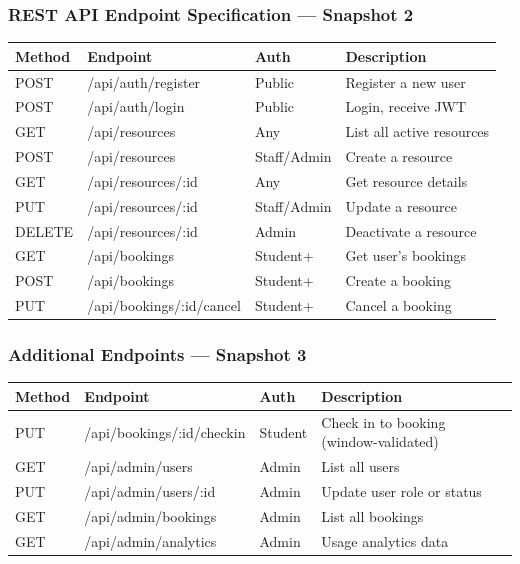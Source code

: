 \documentclass[12pt]{article}
\begin{document}
\subsubsection{REST API Endpoint Specification --- Snapshot 2}

\begin{longtable}{|p{1.4cm}|p{4.5cm}|p{2cm}|p{5cm}|}
\hline
\textbf{Method} & \textbf{Endpoint} & \textbf{Auth} & \textbf{Description} \\
\hline
POST & /api/auth/register & Public & Register a new user \\
\hline
POST & /api/auth/login    & Public & Login, receive JWT \\
\hline
GET  & /api/resources     & Any    & List all active resources \\
\hline
POST & /api/resources     & Staff/Admin & Create a resource \\
\hline
GET  & /api/resources/:id & Any    & Get resource details \\
\hline
PUT  & /api/resources/:id & Staff/Admin & Update a resource \\
\hline
DELETE & /api/resources/:id & Admin  & Deactivate a resource \\
\hline
GET  & /api/bookings      & Student+ & Get user's bookings \\
\hline
POST & /api/bookings      & Student+ & Create a booking \\
\hline
PUT  & /api/bookings/:id/cancel  & Student+ & Cancel a booking \\
\hline
\end{longtable}

\subsubsection{Additional Endpoints --- Snapshot 3}

\begin{longtable}{|p{1.4cm}|p{4.5cm}|p{2cm}|p{5cm}|}
\hline
\textbf{Method} & \textbf{Endpoint} & \textbf{Auth} & \textbf{Description} \\
\hline
PUT & /api/bookings/:id/checkin & Student & Check in to booking (window-validated) \\
\hline
GET & /api/admin/users & Admin & List all users \\
\hline
PUT & /api/admin/users/:id & Admin & Update user role or status \\
\hline
GET & /api/admin/bookings & Admin & List all bookings \\
\hline
GET & /api/admin/analytics & Admin & Usage analytics data \\
\hline
\end{longtable}
\end{document}
